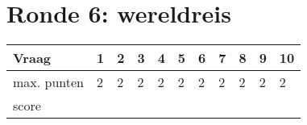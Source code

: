 
\section{Ronde 6: wereldreis}
\begin{questions}

\question[2] \enspace\hrulefill
\vspace{5mm}
\question[2] \enspace\hrulefill
\vspace{5mm}
\question[2] \enspace\hrulefill
\vspace{5mm}
\question[2] \enspace\hrulefill
\vspace{5mm}
\question[2] \enspace\hrulefill
\vspace{5mm}
\question[2] \enspace\hrulefill
\vspace{5mm}
\question[2] \enspace\hrulefill
\vspace{5mm}
\question[2] \enspace\hrulefill
\vspace{5mm}
\question[2] \enspace\hrulefill
\vspace{5mm}
\question[2] \enspace\hrulefill

\end{questions}
\begin{table}[!b]
\centering
\begin{tabular}{|l|l|l|l|l|l|l|l|l|l|l|}
\hline
Vraag       & 1 & 2 & 3 & 4 & 5 & 6 & 7 & 8 & 9 & 10 \\ \hline
max. punten & 2 & 2 & 2 & 2 & 2 & 2 & 2 & 2 & 2 & 2  \\ \hline
score       &   &   &   &   &   &   &   &   &   &    \\ \hline
\end{tabular}
\end{table}
\newpage
